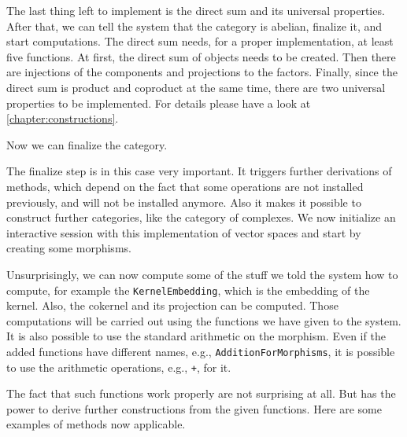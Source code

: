 The last thing left to implement is the direct sum and its universal properties. After that, we can tell the system that the
category is abelian, finalize it, and start computations. The direct sum needs, for a proper implementation, at least five
functions. At first, the direct sum of objects needs to be created. Then there are injections of the components and projections
to the factors. Finally, since the direct sum is product and coproduct at the same time, there are two universal properties to be implemented.
For details please have a look at \ref{chapter:constructions}.



Now we can finalize the category.



The finalize step is in this case very important. It triggers further derivations of methods, which depend on the fact that
some operations are not installed previously, and will not be installed anymore. Also it makes it possible to construct further
categories, like the category of complexes. We now initialize an interactive session with this implementation of vector spaces
and start by creating some morphisms.

\begin{small}

\end{small}

Unsurprisingly, we can now compute some of the stuff we told the system how to compute, for example the \texttt{KernelEmbedding},
which is the embedding of the kernel. Also, the cokernel and its projection can be computed. Those computations will
be carried out using the functions we have given to the system. It is also possible to use the standard arithmetic on the morphism.
Even if the added functions have different names, e.g., \texttt{AdditionForMorphisms}, it is possible to use the \GAP arithmetic
operations, e.g., \texttt{+}, for it.

\begin{small}

\end{small}

The fact that such functions work properly are not surprising at all. But \CapPkg has the power to derive
further constructions from the given functions. Here are some examples of methods now applicable.

\begin{small}

\end{small}

